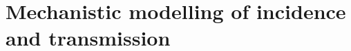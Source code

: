 \documentclass[thesis.tex]{subfiles}
\begin{document}
\chapter{Mechanistic modelling of incidence and transmission}
\end{document}
